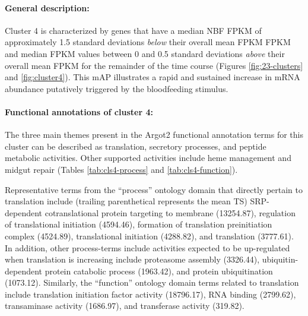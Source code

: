 \paragraph*{General description:}

Cluster 4 is characterized by genes that have a median \gls{NBF} \gls{FPKM} of approximately 1.5 standard deviations \textit{below} their overall mean \gls{FPKM} \gls{FPKM} and median \gls{FPKM} values between 0 and 0.5 standard deviations \textit{above} their overall mean \gls{FPKM} for the remainder of the time course (Figures \ref{fig:23-clusters} and \ref{fig:cluster4}).
%
This \gls{mAP} illustrates a rapid and sustained increase in mRNA abundance putatively triggered by the bloodfeeding stimulus.
%


\paragraph*{Functional annotations of cluster 4:}



The three main themes present in the \gls{Argot2} functional annotation terms for this cluster can be described as translation, secretory processes, and peptide metabolic activities.
%
Other supported activities include heme management and midgut repair (Tables \ref{tab:cls4-process} and \ref{tab:cls4-function}).



Representative terms from the ``process'' ontology domain that directly pertain to translation include (trailing parenthetical represents the mean \gls{TS}) SRP-dependent cotranslational protein targeting to membrane  (13254.87), regulation of translational initiation (4594.46), formation of translation preinitiation complex (4524.89), translational initiation (4288.82), and translation (3777.61).
%
In addition, other process-terms include activities expected to be up-regulated when translation is increasing include proteasome assembly (3326.44), ubiquitin-dependent protein catabolic process (1963.42), and protein ubiquitination (1073.12).
%
Similarly, the ``function'' ontology domain terms related to translation include translation initiation factor activity (18796.17), RNA binding (2799.62), transaminase activity (1686.97), and transferase activity (319.82).

